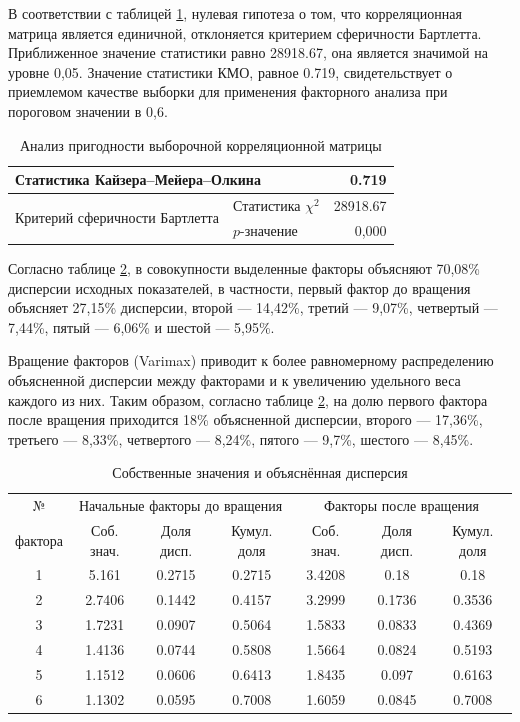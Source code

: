 \documentclass[14pt,a4paper]{extarticle}
\begin{document}
В соответствии с таблицей \ref{tab:kmo}, нулевая гипотеза о том, что корреляционная матрица является единичной, 
отклоняется критерием сферичности Бартлетта. Приближенное значение статистики равно 28918.67, она 
является значимой на уровне 0,05. Значение статистики КМО, равное 0.719, свидетельствует о приемлемом 
качестве выборки для применения факторного анализа при пороговом значении в 0,6.

\begin{table}[H]
    \centering
    \caption{Анализ пригодности выборочной корреляционной матрицы}
    \label{tab:kmo}
    \begin{tabular}{llr}
        \toprule
        \multicolumn{2}{l}{Статистика Кайзера--Мейера--Олкина} & 0.719 \\
        \midrule
        \multirow{2}{*}{Критерий сферичности Бартлетта} & Статистика $\chi^{2}$ & 28918.67 \\
        & $p$-значение & 0,000 \\
        \bottomrule
    \end{tabular}
\end{table}

Согласно таблице \ref{tab:eigen}, в совокупности выделенные факторы объясняют 70,08\% 
дисперсии исходных показателей, в частности, первый фактор до вращения объясняет 27,15\% 
дисперсии, второй --- 14,42\%, третий --- 9,07\%, четвертый --- 7,44\%, пятый --- 6,06\% 
и шестой --- 5,95\%. 

Вращение факторов (Varimax) приводит к более равномерному распределению 
объясненной дисперсии между факторами и к увеличению удельного веса каждого из них. 
Таким образом, согласно таблице \ref{tab:eigen}, на долю первого фактора после вращения приходится 18\% объясненной 
дисперсии, второго --- 17,36\%, третьего --- 8,33\%, четвертого --- 8,24\%, 
пятого --- 9,7\%, шестого --- 8,45\%.

\begin{table}[H]
    \centering
    \caption{Собственные значения и объяснённая дисперсия}
    \label{tab:eigen}
    \small
    \begin{tabular}{c|ccc|ccc}
        \toprule
        № & \multicolumn{3}{c|}{Начальные факторы до вращения} & \multicolumn{3}{c}{Факторы после вращения} \\
        фактора & Соб. знач. & Доля дисп. & Кумул. доля & Соб. знач. & Доля дисп. & Кумул. доля \\
        \midrule

        1 & 5.161 & 0.2715 & 0.2715 & 3.4208 & 0.18 & 0.18 \\
        2 & 2.7406 & 0.1442 & 0.4157 & 3.2999 & 0.1736 & 0.3536 \\
        3 & 1.7231 & 0.0907 & 0.5064 & 1.5833 & 0.0833 & 0.4369 \\
        4 & 1.4136 & 0.0744 & 0.5808 & 1.5664 & 0.0824 & 0.5193 \\
        5 & 1.1512 & 0.0606 & 0.6413 & 1.8435 & 0.097 & 0.6163 \\
        6 & 1.1302 & 0.0595 & 0.7008 & 1.6059 & 0.0845 & 0.7008 \\
        \bottomrule
    \end{tabular}
\end{table}
\end{document}
